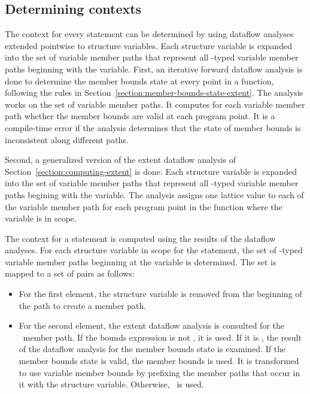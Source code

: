 \subsection{Determining contexts}

The context for every statement can be determined by using dataflow analyses extended
pointwise to structure variables.  Each structure variable is expanded into the set
of variable member paths that represent all \arrayptr-typed variable member paths beginning
with the variable.  First, an iterative forward dataflow analysis is done to determine the
member bounds state at every point in a function, following the rules in
Section~\ref{section:member-bounds-state-extent}.  The analysis works on the set of variable
member paths.   It computes for each variable member path whether the member bounds are valid 
at each program point.  It is a compile-time error if the analysis determines that the state of
member bounds is inconsistent along different paths.

Second, a generalized version of the extent dataflow analysis of Section~\ref{section:computing-extent}
is done.  Each structure variable is expanded into the set of variable
member paths that represent all \arrayptr-typed variable member paths begining with 
the variable.  The analysis assigns one lattice value to each of the variable member path for
each program point in the function where the variable is in scope.

The context for a statement is computed using the results of the dataflow analyses.
For each structure variable in scope for the statement, the set of \arrayptr-typed variable member paths 
beginning at the variable is determined.  The set is mapped to a set of pairs as follows:
\begin{itemize}
\item For the first element, the structure variable is removed from the beginning of the
path to create a member path.
\item For the second element, the extent dataflow analysis is consulted for the \arrayptr\ member path.
   If the bounds expression is not \boundsunknown, it is used.   If it is \boundsunknown, the result
   of the dataflow analysis for the member bounds state is examined. If the member bounds
   state is valid, the member bounds is used.  It is transformed to use variable member
   bounds by prefixing the member paths that occur in it with the structure variable.
   Otherwise, \boundsunknown\ is used.
\end{itemize}

